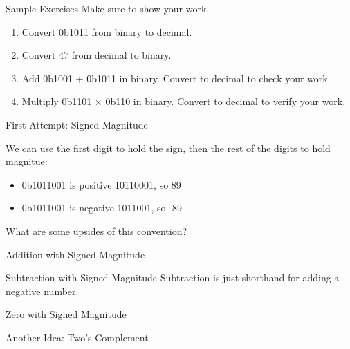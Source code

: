 \begin{frame}{Sample Exercises}
Make sure to show your work.
\vfill 
\begin{enumerate}
    \item Convert 0b1011 from binary to decimal. 
    \vfill
    \item Convert 47 from decimal to binary.
    \vfill
    \item Add 0b1001 + 0b1011 in binary. Convert to decimal to check your work.
    \vfill
    \item Multiply 0b1101 $\times$ 0b110 in binary. Convert to decimal to verify your work.
    \vfill 
\end{enumerate}
\end{frame}



\begin{frame}{First Attempt: Signed Magnitude}

We can use the first digit to hold the sign, then the rest of the digits to hold magnitue:

    \begin{itemize}
        \item 0b1011001 is positive 10110001, so 89
        \item 0b1011001 is negative 1011001, so -89 
    \end{itemize}

What are some upsides of this convention?


\end{frame}

\begin{frame}{Addition with Signed Magnitude}



\end{frame}


\begin{frame}{Subtraction with Signed Magnitude}
Subtraction is just shorthand for adding a negative number.


\end{frame}



\begin{frame}{Zero with Signed Magnitude}
\end{frame}

\begin{frame}{Another Idea: Two's Complement}
\end{frame}

